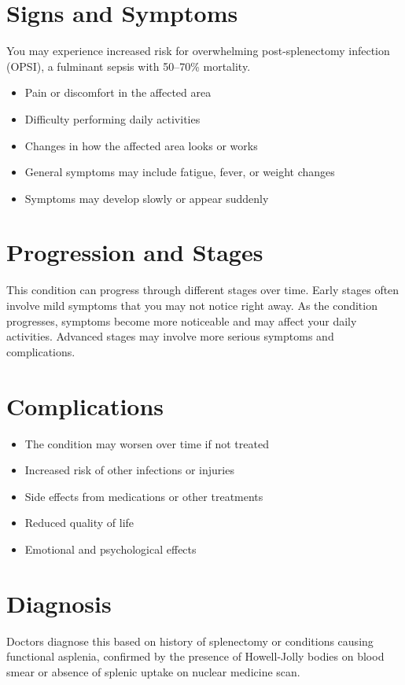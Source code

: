 \section{Signs and Symptoms}
You may experience increased risk for overwhelming post-splenectomy infection (OPSI), a fulminant sepsis with 50--70\% mortality.

\begin{itemize}[noitemsep]
  \item Pain or discomfort in the affected area
  \item Difficulty performing daily activities
  \item Changes in how the affected area looks or works
  \item General symptoms may include fatigue, fever, or weight changes
  \item Symptoms may develop slowly or appear suddenly
\end{itemize}

\section{Progression and Stages}
This condition can progress through different stages over time. Early stages often involve mild symptoms that you may not notice right away. As the condition progresses, symptoms become more noticeable and may affect your daily activities. Advanced stages may involve more serious symptoms and complications.

\section{Complications}

\begin{itemize}[noitemsep]
  \item The condition may worsen over time if not treated
  \item Increased risk of other infections or injuries
  \item Side effects from medications or other treatments
  \item Reduced quality of life
  \item Emotional and psychological effects
\end{itemize}

\section{Diagnosis}
Doctors diagnose this based on history of splenectomy or conditions causing functional asplenia, confirmed by the presence of Howell-Jolly bodies on blood smear or absence of splenic uptake on nuclear medicine scan.

